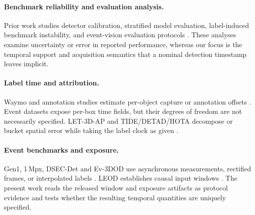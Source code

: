 \documentclass[10pt,twocolumn,letterpaper]{article}
\begin{document}
\paragraph{Benchmark reliability and evaluation analysis.}
Prior work studies detector calibration, stratified model evaluation, label-induced benchmark
instability, and event-vision evaluation protocols
\cite{oncalibration2024,stratification2024,northcutt2021labelerrors,ercan2023evreal}.
These analyses examine uncertainty or error in reported performance, whereas our focus is the
temporal support and acquisition semantics that a nominal detection timestamp leaves implicit.

\paragraph{Label time and attribution.}
Waymo and annotation studies estimate per-object capture or annotation offsets
\cite{waymolabelproto,sun2020waymo,nunez2026annotations}. Event datasets expose
per-box time fields, but their degrees of freedom are not necessarily specified.
LET-3D-AP and TIDE/DETAD/HOTA decompose or bucket spatial error while taking the
label clock as given \cite{hung2022let,bolya2020tide,hoiem2012diagnosing,alwassel2018detad,luiten2021hota}.

\paragraph{Event benchmarks and exposure.}
Gen1, 1\,Mpx, DSEC-Det and Ev-3DOD use asynchronous measurements, rectified
frames, or interpolated labels \cite{detournemire2020gen1,perot2020megapixel,
gehrig2024lowlatency,cho2025ev3dod}. LEOD establishes causal input windows
\cite{wu2024leod}. The present work reads the released window and exposure
artifacts as protocol evidence and tests whether the resulting temporal
quantities are uniquely specified.

\iffalse
\end{document}
